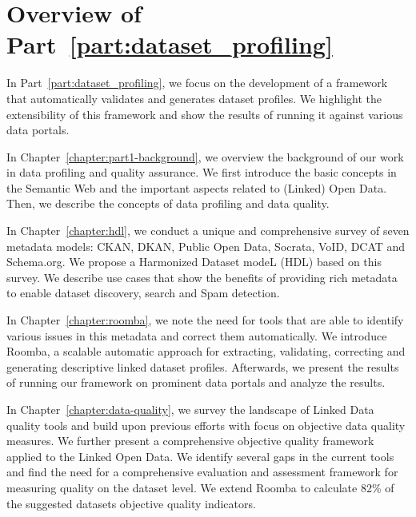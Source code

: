 \chapter*{Overview of Part~\ref{part:dataset_profiling}}

In Part~\ref{part:dataset_profiling}, we focus on the development of a framework that automatically validates and generates dataset profiles. We highlight the extensibility of this framework and show the results of running it against various data portals.

In Chapter~\ref{chapter:part1-background}, we overview the background of our work in data profiling and quality assurance. We first introduce the basic concepts in the Semantic Web and the important aspects related to (Linked) Open Data. Then, we describe the concepts of data profiling and data quality.

In Chapter~\ref{chapter:hdl}, we conduct a unique and comprehensive survey of seven metadata models: CKAN, DKAN, Public Open Data, Socrata, VoID, DCAT and Schema.org. We propose a Harmonized Dataset modeL (HDL) based on this survey. We describe use cases that show the benefits of providing rich metadata to enable dataset discovery, search and Spam detection.

In Chapter~\ref{chapter:roomba}, we note the need for tools that are able to identify various issues in this metadata and correct them automatically. We introduce Roomba, a scalable automatic approach for extracting, validating, correcting and generating descriptive linked dataset profiles. Afterwards, we present the results of running our framework on prominent data portals and analyze the results.

In Chapter~\ref{chapter:data-quality}, we survey the landscape of Linked Data quality tools and build upon previous efforts with focus on objective data quality measures. We further present a comprehensive objective quality framework applied to the Linked Open Data. We identify several gaps in the current tools and find the need for a comprehensive evaluation and assessment framework for measuring quality on the dataset level. We extend Roomba to calculate 82\% of the suggested datasets objective quality indicators.